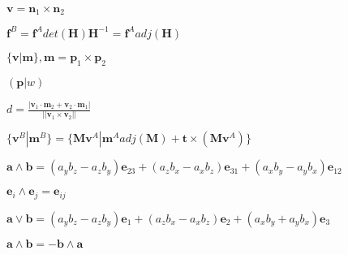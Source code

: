 \documentclass{article}
\def\lthtmlcheckvsize{\ifdim\ht\sizebox<\vsize 
  \ifdim\wd\sizebox<\hsize\expandafter\hfill\fi \expandafter\vfill
  \else\expandafter\vss\fi}%
\begin{document}
{\newpage\clearpage
{}%
$ \textbf{v} = \textbf{n}_1 \times \textbf{n}_2$%
\lthtmlindisplaymathZ
\lthtmlcheckvsize\clearpage}

{\newpage\clearpage
{}%
$ \textbf{f}^B = \textbf{f}^A det(\textbf{H})\textbf{H}^{-1} = 
\textbf{f}^A adj(\textbf{H}) $%
\lthtmlindisplaymathZ
\lthtmlcheckvsize\clearpage}

{\newpage\clearpage
{}%
$ \{\textbf{v}|\textbf{m}\}, 
\textbf{m} = \textbf{p}_1 \times \textbf{p}_2 $%
\lthtmlindisplaymathZ
\lthtmlcheckvsize\clearpage}

{\newpage\clearpage
{}%
$ (\textbf{p} | w) $%
\lthtmlindisplaymathZ
\lthtmlcheckvsize\clearpage}

{\newpage\clearpage
{}%
$ d = \frac{|\textbf{v}_1 \cdot \textbf{m}_2 + \textbf{v}_2 \cdot \textbf{m}_1|}
{||\textbf{v}_1 \times \textbf{v}_2||} $%
\lthtmlindisplaymathZ
\lthtmlcheckvsize\clearpage}



\setlength{\extrarowheight}{10pt}%

\setlength{\extrarowheight}{10pt}
{\newpage\clearpage
{}%
$ \{\textbf{v}^B | \textbf{m}^B\} = \{\textbf{M}\textbf{v}^A | 
\textbf{m}^A adj(\textbf{M}) + \textbf{t} \times (\textbf{M}\textbf{v}^A)\}$%
\lthtmlindisplaymathZ
\lthtmlcheckvsize\clearpage}

{\newpage\clearpage
{}%
$ \textbf{a} \wedge \textbf{b} = (a_yb_z - a_zb_y)\textbf{e}_{23} + (a_zb_x - a_xb_z)\textbf{e}_{31}
+ (a_xb_y - a_yb_x)\textbf{e}_{12} $%
\lthtmlindisplaymathZ
\lthtmlcheckvsize\clearpage}

{\newpage\clearpage
{}%
$ \textbf{e}_i \wedge \textbf{e}_j = \textbf{e}_{ij}$%
\lthtmlindisplaymathZ
\lthtmlcheckvsize\clearpage}

{\newpage\clearpage
{}%
$ \textbf{a} \vee \textbf{b} = (a_yb_z - a_zb_y)\textbf{e}_{1} + (a_zb_x - a_xb_z)\textbf{e}_{2}
+ (a_xb_y + a_yb_x)\textbf{e}_{3} $%
\lthtmlindisplaymathZ
\lthtmlcheckvsize\clearpage}

{\newpage\clearpage
{}%
$ \textbf{a} \wedge \textbf{b} = -\textbf{b} \wedge \textbf{a}$%
\lthtmlindisplaymathZ
\lthtmlcheckvsize\clearpage}
\end{document}
